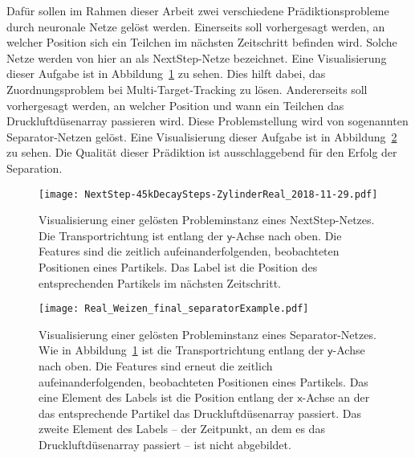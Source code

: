 Dafür sollen im Rahmen dieser Arbeit zwei verschiedene Prädiktionsprobleme durch neuronale Netze gelöst werden.
Einerseits soll vorhergesagt werden, an welcher Position sich ein Teilchen im nächsten Zeitschritt befinden wird.
Solche Netze werden von hier an als NextStep-Netze bezeichnet.
Eine Visualisierung dieser Aufgabe ist in Abbildung~\ref{fig:visualsNextstep} zu sehen.
Dies hilft dabei, das Zuordnungsproblem bei Multi-Target-Tracking zu lösen.
Andererseits soll vorhergesagt werden, an welcher Position und wann ein Teilchen das Druckluftdüsenarray passieren wird.
Diese Problemstellung wird von sogenannten Separator-Netzen gelöst.
Eine Visualisierung dieser Aufgabe ist in Abbildung~\ref{fig:visualsSeparator} zu sehen.
Die Qualität dieser Prädiktion ist ausschlaggebend für den Erfolg der Separation.


\begin{figure}[p]
    \centering
    \texttt{[image: NextStep-45kDecaySteps-ZylinderReal\_2018-11-29.pdf]}
    \caption[Visualisierung einer gelösten Probleminstanz eines NextStep-Netzes]{Visualisierung einer gelösten 
    Probleminstanz eines NextStep-Netzes. Die Transportrichtung ist entlang der \(\mathsf{y}\)-Achse nach oben.
    Die Features sind die zeitlich aufeinanderfolgenden, beobachteten Positionen eines Partikels.
    Das Label ist die Position des entsprechenden Partikels im nächsten Zeitschritt.
    }
    \label{fig:visualsNextstep}
\end{figure}


\begin{figure}[p]
    \centering
	\texttt{[image: Real\_Weizen\_final\_separatorExample.pdf]}
    \caption[Visualisierung einer gelösten Probleminstanz eines Separator-Netzes]{Visualisierung einer gelösten Probleminstanz 
    eines Separator-Netzes.
    Wie in Abbildung~\ref{fig:visualsNextstep} ist die Transportrichtung entlang der \(\mathsf{y}\)-Achse nach oben.
    Die Features sind erneut die zeitlich aufeinanderfolgenden, beobachteten Positionen eines Partikels.
    Das eine Element des Labels ist die Position entlang der \(\mathsf{x}\)-Achse an der das entsprechende Partikel das Druckluftdüsenarray passiert.
    Das zweite Element des Labels -- der Zeitpunkt, an dem es das Druckluftdüsenarray passiert -- ist nicht abgebildet.
    }
	
	\label{fig:visualsSeparator}
\end{figure}




